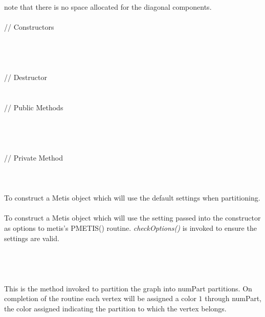 \noindent note that there is no space allocated for the diagonal
components. \\

  \\
\indent\indent // Constructors  \\
\indent{}  \\ \\
\indent{}  \\ \\
\indent\indent // Destructor  \\
\indent{}  \\ \\
\indent\indent // Public Methods  \\
\indent{} \\
\indent{}\\
\indent{}  \\ \\
\indent\indent // Private Method  \\
\indent{} \\


  \\
  \\
To construct a Metis object which will use the default settings when
partitioning. \\ 

  \\
To construct a Metis object which will use the setting passed into the
constructor as options to metis's PMETIS() routine. {\em
checkOptions()} is invoked to ensure the settings are valid. \\

  \\
  \\

  \\
 \\
This is the method invoked to partition the graph into \p numPart
partitions. On completion of the routine each vertex will be assigned
a color $1$ through \p numPart, the color assigned indicating the
partition to which the vertex belongs. 

